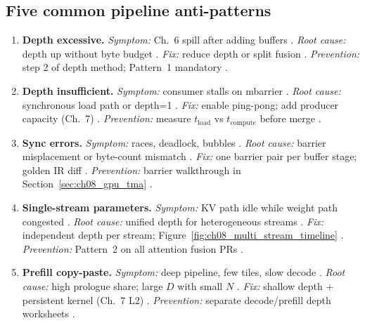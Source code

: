 \subsection{Five common pipeline anti-patterns}
\begin{enumerate}
\item \textbf{Depth excessive.}
\emph{Symptom:} Ch.~6 spill after adding buffers \citep{memoryfloor2026,yirage2026}.
\emph{Root cause:} depth up without byte budget \citep{dao2022flashattention,chen2020compilerbasedhardw}.
\emph{Fix:} reduce depth or split fusion \citep{wu2024mirage}.
\emph{Prevention:} step 2 of depth method; Pattern~1 mandatory \citep{yirage2026,taxbreak2026}.

\item \textbf{Depth insufficient.}
\emph{Symptom:} consumer stalls on mbarrier \citep{shah2024flashattention3,patel2025llminference}.
\emph{Root cause:} synchronous load path or depth=1 \citep{semianalysis2024tma}.
\emph{Fix:} enable ping-pong; add producer capacity (Ch.~7) \citep{yirage2026}.
\emph{Prevention:} measure $t_{\mathrm{load}}$ vs $t_{\mathrm{compute}}$ before merge \citep{memoryfloor2026,shah2024flashattention3}.

\item \textbf{Sync errors.}
\emph{Symptom:} races, deadlock, bubbles \citep{shah2024flashattention3,nvidia2022hopper}.
\emph{Root cause:} barrier misplacement or byte-count mismatch \citep{semianalysis2024tma}.
\emph{Fix:} one barrier pair per buffer stage; golden IR diff \citep{yirage2026,chen2020compilerbasedhardw}.
\emph{Prevention:} barrier walkthrough in Section~\ref{sec:ch08_gpu_tma} \citep{semianalysis2024tma,patel2025llminference}.

\item \textbf{Single-stream parameters.}
\emph{Symptom:} KV path idle while weight path congested \citep{kwon2023vllm,dao2023flashdecoding}.
\emph{Root cause:} unified depth for heterogeneous streams \citep{patel2025llminference}.
\emph{Fix:} independent depth per stream; Figure~\ref{fig:ch08_multi_stream_timeline} \citep{yirage2026,shah2024flashattention3}.
\emph{Prevention:} Pattern~2 on all attention fusion PRs \citep{dao2022flashattention,taxbreak2026}.

\item \textbf{Prefill copy-paste.}
\emph{Symptom:} deep pipeline, few tiles, slow decode \citep{shah2024flashattention3,taxbreak2026}.
\emph{Root cause:} high prologue share; large $D$ with small $N$ \citep{patel2025llminference,memoryfloor2026}.
\emph{Fix:} shallow depth + persistent kernel (Ch.~7 L2) \citep{mpk2025,nvidia2024cudagraphs}.
\emph{Prevention:} separate decode/prefill depth worksheets \citep{kwon2023vllm,yirage2026}.
\end{enumerate}

